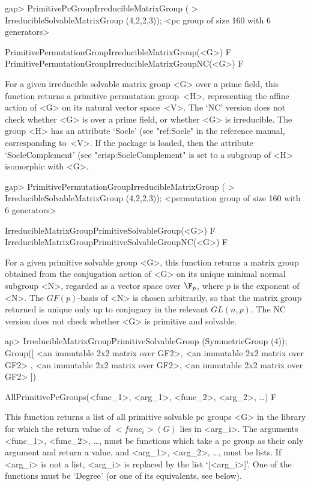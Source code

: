 \beginexample
gap> PrimitivePcGroupIrreducibleMatrixGroup (
>       IrreducibleSolvableMatrixGroup (4,2,2,3));
<pc group of size 160 with 6 generators>
\endexample

\>PrimitivePermutationGroupIrreducibleMatrixGroup(<G>) F
\>PrimitivePermutationGroupIrreducibleMatrixGroupNC(<G>) F

For a given irreducible solvable matrix group <G> over a prime field, this function
returns a primitive permutation group~<H>, representing the affine action of <G> on its natural
vector space~<V>. The `NC' version does not check whether <G> is over a prime field, 
or whether <G> is irreducible. The group <H> has an attribute `Socle' (see "ref:Socle" 
in the {\GAP} reference manual, corresponding to~<V>. If the package {\CRISP} is loaded, 
then the attribute `SocleComplement' (see "crisp:SocleComplement" is set to a subgroup of 
<H> isomorphic with <G>.

\beginexample
gap> PrimitivePermutationGroupIrreducibleMatrixGroup (
>       IrreducibleSolvableMatrixGroup (4,2,2,3));
<permutation group of size 160 with 6 generators>
\endexample

\>IrreducibleMatrixGroupPrimitiveSolvableGroup(<G>) F
\>IrreducibleMatrixGroupPrimitiveSolvableGroupNC(<G>) F

For a given primitive solvable group <G>, this function returns a matrix group 
obtained from the conjugation
action of <G> on its unique minimal normal subgroup <N>, regarded as a vector 
space over $\F_p$, where $p$ is the exponent of <N>. 
The $GF(p)$-basis of <N> is chosen arbitrarily, so that the matrix group returned 
is unique only up to conjugacy in the relevant $GL(n, p)$. The NC version does
not check whether <G> is primitive and solvable.

\beginexample
ap> IrreducibleMatrixGroupPrimitiveSolvableGroup (SymmetricGroup (4));
Group([ <an immutable 2x2 matrix over GF2>, <an immutable 2x2 matrix over GF2>
    , <an immutable 2x2 matrix over GF2>, <an immutable 2x2 matrix over GF2> 
 ])
\endexample


\>AllPrimitivePcGroups(<func_1>, <arg_1>, <func_2>, <arg_2>, \dots) F

This function returns a list of all primitive solvable pc
groups <G> in the  {\IRREDSOL} library for which the return value of $<func_i>(G)$ lies
in <arg_i>.  The arguments <func_1>, <func_2>, \dots,
must be {\GAP} functions which take a pc group as their only argument and return a
value, and <arg_1>, <arg_2>,
\dots,  must be lists. If <arg_i> is not a list, <arg_i> is replaced by the list
`[<arg_i>]'. One of the functions must be `Degree' (or one of its
equivalents, see below).

